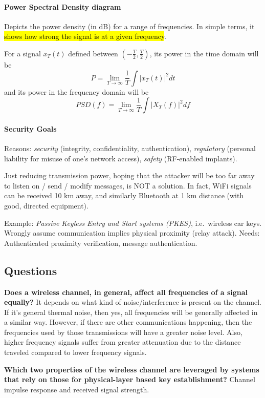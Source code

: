 \paragraph{Power Spectral Density diagram}
Depicts the power density (in dB) for a range of frequencies. In simple terms,
it \hl{shows how strong the signal is at a given frequency}.

For a signal $x_T(t)$ defined between $(-\frac{T}{2}, \frac{T}{2})$, its power
in the time domain will be \[P = \lim_{T\rightarrow \infty} \frac{1}{T} \int |x_T(t)|^2 dt \] and its power in the frequency domain will be \[PSD(f) = \lim_{T\rightarrow \infty} \frac{1}{T} \int |X_T(f)|^2 df \]

\paragraph{Security Goals}
Reasons: \textit{security} (integrity, confidentiality, authentication),
\textit{regulatory} (personal liability for misuse of one's network access),
\textit{safety} (RF-enabled implants).

Just reducing transmission power, hoping that the attacker will be too far away
to listen on / send / modify messages, is NOT a solution. In fact, WiFi signals
can be received 10 km away, and similarly Bluetooth at 1 km distance (with
good, directed equipment).

Example: \textit{Passive Keyless Entry and Start systems (PKES)}, i.e.\
wireless car keys. Wrongly assume communication implies physical proximity
(relay attack). Needs: Authenticated proximity verification, message
authentication.

\subsection{Questions}
\textbf{Does a wireless channel, in general, affect all frequencies of a signal equally?} It depends on what kind of noise/interference is present on the channel. If it's general thermal noise, then yes, all frequencies will be generally affected in a similar way. However, if there are other communications happening, then the frequencies used by those transmissions will have a greater noise level.
Also, higher frequency signals suffer from greater attenuation due to the distance traveled compared to lower frequency signals.

\textbf{Which two properties of the wireless channel are leveraged by systems that rely on those for physical-layer based key establishment?} Channel impulse response and received signal strength.
